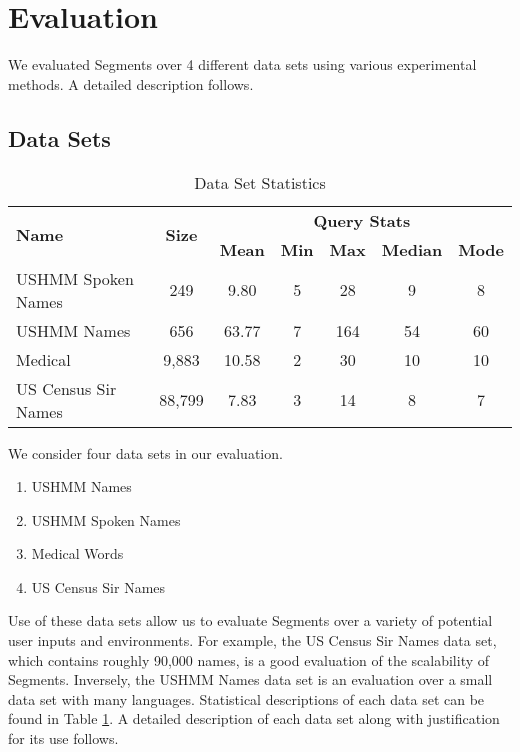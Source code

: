 \documentclass{article}
\begin{document}
\section{Evaluation} %
\label{sec:evaluation}

We evaluated Segments over 4 different data sets using various experimental methods.  A detailed description follows.

\subsection{Data Sets} %
\label{sub:data_sets}

\begin{table}
	\centering
	\caption{Data Set Statistics}
	\begin{tabular}{|l|c|c|c|c|c|c|}
		\hline
		\multirow{2}{*}{\textbf{Name}} & \multirow{2}{*}{\textbf{Size}} & \multicolumn{5}{|c|}{\textbf{Query Stats}}\\
		\cline{3-7}
		  & & \textbf{Mean} & \textbf{Min} & \textbf{Max} & \textbf{Median} & \textbf{Mode} \\
		\hline
		USHMM Spoken Names & 249 & 9.80 & 5 & 28 & 9 & 8 \\
		USHMM Names & 656 & 63.77 & 7 & 164 & 54 & 60 \\
		Medical & 9,883 & 10.58 & 2 & 30 & 10 & 10 \\
		US Census Sir Names & 88,799 & 7.83 & 3 & 14 & 8 & 7 \\
		\hline
	\end{tabular}
	\label{tab:query_performance}
\end{table}

We consider four data sets in our evaluation.

\begin{enumerate}
	\item USHMM Names
	\item USHMM Spoken Names
	\item Medical Words
	\item US Census Sir Names
\end{enumerate}

Use of these data sets allow us to evaluate Segments over a variety of potential user inputs and environments.  For example, the US Census Sir Names data set, which contains roughly 90,000 names, is a good evaluation of the scalability of Segments.  Inversely, the USHMM Names data set is an evaluation over a small data set with many languages.  Statistical descriptions of each data set can be found in Table \ref{tab:query_performance}.	A detailed description of each data set along with justification for its use follows.
\end{document}
